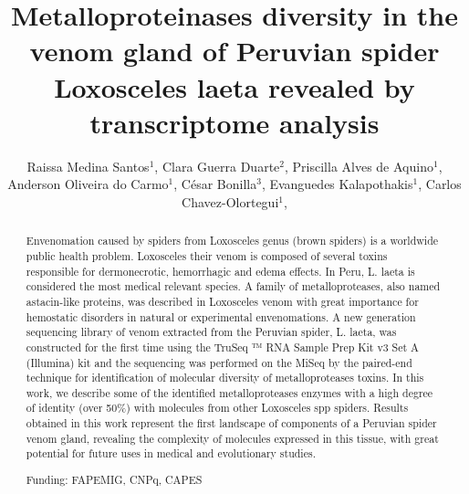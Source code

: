 \documentclass[twoside]{article}
\title{\vspace{-15mm}\fontsize{24pt}{10pt}\selectfont\textbf{ Metalloproteinases diversity in the venom gland of Peruvian spider Loxosceles laeta revealed by transcriptome analysis }} %
\author{ Raissa Medina Santos$^{1}$, Clara Guerra Duarte$^{2}$, Priscilla Alves de Aquino$^{1}$, Anderson Oliveira do Carmo$^{1}$, César Bonilla$^{3}$, Evanguedes Kalapothakis$^{1}$, Carlos Chavez-Olortegui$^{1}$, }
\affil{ 1 Universidade Federal de Minas Gerais

2 Fundação Ezequiel Dias

3 Instituto Nacional de Salud

 }
\date{}
\begin{document}
  
  
  \maketitle %
  
  
  \thispagestyle{fancy} %
  
  
  \begin{abstract}
  Envenomation caused by spiders from Loxosceles genus (brown spiders) is a worldwide public health problem. Loxosceles their venom is composed of several toxins responsible for dermonecrotic, hemorrhagic and edema effects. In Peru, L. laeta is considered  the most medical relevant species. A family of metalloproteases, also named astacin-like proteins, was described in Loxosceles venom with great importance for hemostatic disorders in natural or experimental envenomations. A new generation sequencing library of venom extracted from the Peruvian spider, L. laeta, was constructed for the first time using the TruSeq ™ RNA Sample Prep Kit v3 Set A (Illumina) kit and the sequencing was performed on the MiSeq by the paired-end technique for identification of molecular diversity of metalloproteases toxins. In this work, we describe some of the identified metalloproteases enzymes with a high degree of identity (over 50\%) with molecules from other Loxosceles spp spiders. Results obtained in this work represent the first landscape of components of a Peruvian spider venom gland, revealing the complexity of molecules expressed in this tissue, with great potential for future uses in medical and evolutionary studies.
  
  Funding: FAPEMIG, CNPq, CAPES \\ 
  \end{abstract}
  
\end{document}
